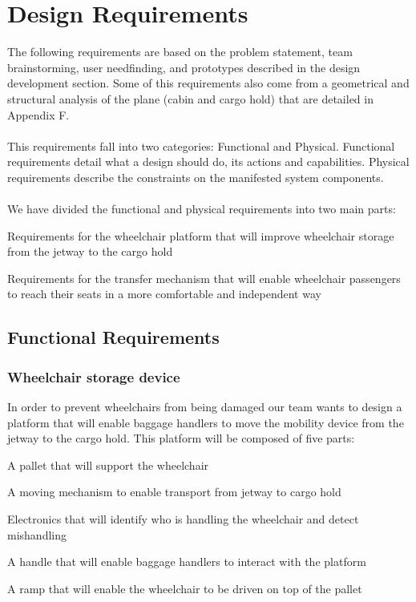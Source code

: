 \chapter{Design Requirements}

The following requirements are based on the problem statement, team brainstorming, user needfinding, and prototypes described in the design development section. Some of this requirements also come from a geometrical and structural analysis of the plane (cabin and cargo hold) that are detailed in Appendix F.
\\
\\This requirements fall into two categories: Functional and Physical. Functional requirements detail what a design should do, its actions and capabilities. Physical requirements describe the constraints on the manifested system components. 
\\
\\ We have divided the functional and physical requirements into two main parts:
\begin{list}{-}{}
  \item Requirements for the wheelchair platform that will improve wheelchair storage from the jetway to the cargo hold
  \item Requirements for the transfer mechanism that will enable wheelchair passengers to reach their seats in a more comfortable and independent way
\end{list} 

\section{Functional Requirements}

\subsection*{Wheelchair storage device}

In order to prevent wheelchairs from being damaged our team wants to design a platform that will enable baggage handlers to move the mobility device from the jetway to the cargo hold. This platform will be composed of five parts:

\begin{list}{-}{}
  \item A pallet that will support the wheelchair
  \item A moving mechanism to enable transport from jetway to cargo hold
  \item Electronics that will identify who is handling the wheelchair and detect mishandling
  \item A handle that will enable baggage handlers to interact with the platform
  \item A ramp that will enable the wheelchair to be driven on top of the pallet
\end{list}

